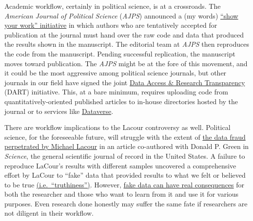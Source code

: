\documentclass[11pt,]{article}
\begin{document}
Academic workflow, certainly in political science, is at a crossroads.
The \emph{American Journal of Political Science} (\emph{AJPS}) announced
a (my words)
\href{http://ajps.org/2015/03/26/the-ajps-replication-policy-innovations-and-revisions/}{``show
your work'' initiative} in which authors who are tentatively accepted
for publication at the journal must hand over the raw code and data that
produced the results shown in the manuscript. The editorial team at
\emph{AJPS} then reproduces the code from the manuscript. Pending
successful replication, the manuscript moves toward publication. The
\emph{AJPS} might be at the fore of this movement, and it could be the
most aggressive among political science journals, but other journals in
our field have signed the joint
\href{http://www.dartstatement.org/}{Data Access \& Research
Transparency} (DART) initiative. This, at a bare minimum, requires
uploading code from quantitatively-oriented published articles to
in-house directories hosted by the journal or to services like
\href{http://dataverse.org/}{Dataverse}.

There are workflow implications to the Lacour controversy as well.
Political science, for the foreseeable future, will struggle with the
extent of
\href{http://stanford.edu/~dbroock/broockman_kalla_aronow_lg_irregularities.pdf}{the
data fraud perpetrated by Michael Lacour} in an article co-authored with
Donald P. Green in \emph{Science}, the general scientific journal of
record in the United States. A failure to reproduce LaCour's results
with different samples uncovered a comprehensive effort by LaCour to
``fake'' data that provided results to what we felt or believed to be
true
\href{http://chronicle.com/article/LAffaire-LaCour/230905/}{(i.e.~``truthiness'')}.
However,
\href{http://kieranhealy.org/blog/archives/2015/05/20/fake-science-real-consequences/}{fake
data can have real consequences} for both the researcher and those who
want to learn from it and use it for various purposes. Even research
done honestly may suffer the same fate if researchers are not diligent
in their workflow.
\end{document}
